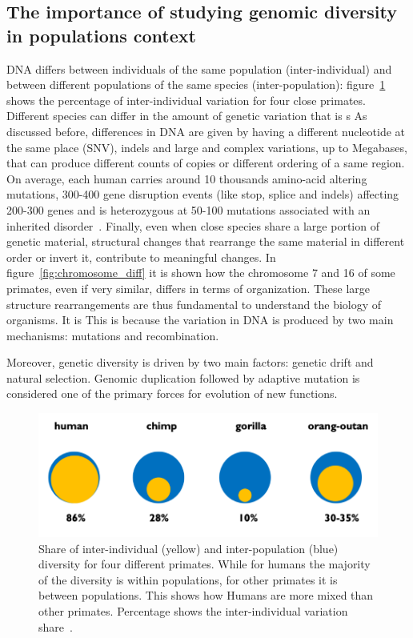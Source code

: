 \subsection{The importance of studying genomic diversity in populations context}
DNA differs between individuals of the same population (inter-individual) and between different populations of the same species (inter-population): figure~\ref{fig:pop_diff} shows the percentage of inter-individual variation for four close primates. Different species can differ in the amount of genetic variation that is s As discussed before, differences in DNA are given by having a different nucleotide at the same place (SNV), indels and large and complex variations, up to Megabases, that can produce different counts of copies or different ordering of a same region. \\
On average, each human carries around 10 thousands amino-acid altering mutations, 300-400 gene disruption events (like stop, splice and indels) affecting 200-300 genes and is heterozygous at 50-100 mutations associated with an inherited disorder~\cite{genome_diversity_quintana}. 
Finally, even when close species share a large portion of genetic material, structural changes that rearrange the same material in different order or invert it, contribute to meaningful changes. In figure~\ref{fig:chromosome_diff} it is shown how the chromosome 7 and 16 of some primates, even if very similar, differs in terms of organization. These large structure rearrangements are thus fundamental to understand the biology of organisms.
It is 
This is because the variation in DNA is produced by two main mechanisms: mutations and recombination. 

Moreover, genetic diversity is driven by two main factors: genetic drift and natural selection. Genomic duplication followed by adaptive mutation is considered one of the primary forces for evolution of new functions.
\begin{figure}[h!]
	\centering
	\includegraphics[width=.8\linewidth]{figures/background/pop_diff.png}
	\caption[Inter-individual and inter-population variation for 4 primate species.]{Share of inter-individual (yellow) and inter-population (blue) diversity for four different primates. While for humans the  majority of the diversity is within populations, for other primates it is between populations. This shows how Humans are more mixed than other primates. Percentage shows the inter-individual variation share~\cite{genome_diversity_quintana}.}
	\label{fig:pop_diff}
\end{figure}

